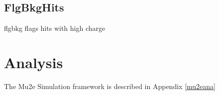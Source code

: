 \subsection{FlgBkgHits}
flgbkg flags hits with high charge

\section{Analysis}
The Mu2e Simulation framework is described in Appendix \ref{mu2eana}
